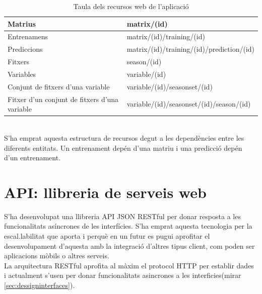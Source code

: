 \begin{table}
\begin{tabular}{| p{5cm} | p{10cm} |}
\hline
Matrius     & matrix/(id) \\ \hline
Entrenamens & matrix/(id)/training/(id) \\ \hline
Prediccions & matrix/(id)/training/(id)/prediction/(id) \\ \hline
Fitxers 	& season/(id) \\ \hline
Variables	& variable/(id) \\ \hline
Conjunt de fitxers d'una variable & variable/(id)/seasonset/(id) \\ \hline
Fitxer d'un conjunt de fitxers d'una variable & variable/(id)/seasonset/(id)/season/(id) \\ \hline
\end{tabular}
\caption{Taula dels recursos web de l'aplicació}
\end{table}
\\

S'ha emprat aquesta estructura de recursos degut a les dependències entre les diferents entitats. Un entrenament dep\'{e}n d'una matriu i una predicci\'{o} dep\'{e}n d'un entrenament.

\section{API: llibreria de serveis web}
S'ha desenvolupat una llibreria API JSON RESTful per donar resposta a les funcionalitats asíncrones de les interfícies.\cite{apijson} S'ha emprat aquesta tecnologia per la escal.labilitat que aporta i perquè en un futur es pugui aprofitar el desenvolupament d'aquesta amb la integració d'altres tipus client, com poden ser aplicacions mòbils o altres serveis.\\

La arquitectura RESTful aprofita al màxim el protocol HTTP per establir dades i actualment s'usen per donar funcionalitats asincrones a les interficies(mirar \ref{sec:dessigninterfaces}).

